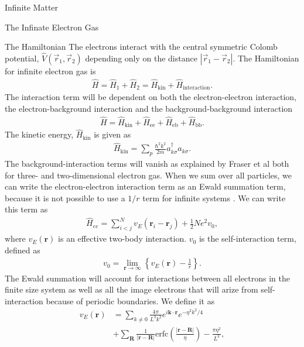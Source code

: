 \documentclass[twoside,english]{uiofysmaster}
\begin{document}
\begin{chapter}{Infinite Matter}
\begin{section}{The Infinate Electron Gas}
		\begin{subsection}{The Hamiltonian}
			The electrons interact with the central symmetric Colomb potential, $\hat V(\vec r_1, \vec r_2)$ depending only on the distance $\left| \vec r_1 - \vec r_2 \right|$. The Hamiltonian for infinite electron gas is \cite{Baardsen}
			\begin{align}
				\hat H = \hat H_1 + \hat H_2 = \hat H_{\text{kin}} + \hat H_{\text{interaction}}.
			\end{align}
			The interaction term will be dependent on both the electron-electron interaction, the electron-background interaction and the background-background interaction
			\begin{align}
				\hat H = \hat H_{\text{kin}} + \hat H_{\text{ee}} + \hat H_{\text{eb}} + \hat H_{\text{bb}}.
			\end{align}
			The kinetic energy, $\hat H_{\text{kin}}$ is given as
			\begin{align}
				\hat H_{\text{kin}} = \sum_p \frac{\hbar ^2 k^2}{2m} a_{k \sigma}^{\dagger} a_{k \sigma}.
			\end{align}
			The background-interaction terms will vanish as explained by Fraser et al \cite{Fraser et al} both for three- and two-dimensional electron gas. When we sum over all particles, we can write the electron-electron interaction term as an Ewald summation term, because it is not possible to use a $1/r$ term for infinite systems \cite{Drummond2008} \cite{MHJonline}. We can write this term as
			\begin{align}
				\hat H_{ee} = \sum_{i<j}^N v_E(\mathbf{r}_i - \mathbf{r}_j) + \frac{1}{2}Ne^2v_0,
			\end{align}
			where $v_E(\mathbf{r})$ is an effective two-body interaction. $v_0$ is the self-interaction term, defined as 
			\begin{align}
				v_0 = \lim_{\mathbf{r}\rightarrow \infty} \left\{ v_E(\mathbf{r}) - \frac{1}{r} \right\}.
			\end{align}
			The Ewald summation will account for interactions between all electrons in the finite size system as well as all the image electrons that will arize from self-interaction because of periodic boundaries. We define it as 
			\begin{align}
				v_E(\mathbf{r}) &= \sum_{k \neq 0} \frac{4\pi}{L^3k^2} e^{i \mathbf{k}\cdot \mathbf{r} } e^{-\eta^2 k^2 / 4} \\
								&+ \sum_{\mathbf{R}} \frac{1}{|	\mathbf{r} - \mathbf{R}|} \text{erfc} \left( \frac{| \mathbf{r} - \mathbf{R}|}{\eta} \right) - \frac{\pi \eta^2}{L^3}, \nonumber

\end{align}
\end{subsection}
\end{section}
\end{chapter}
\end{document}

